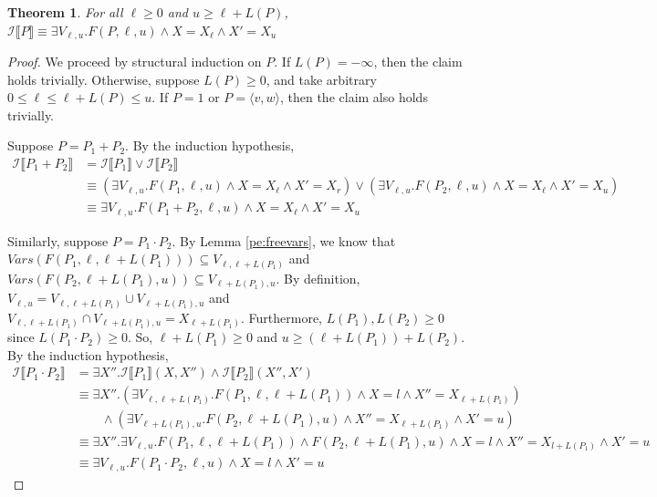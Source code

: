 \documentclass{article}
\newcommand{\tuple}[1]{\langle #1 \rangle}
\newcommand{\tf}[1]{\mathscr{I} \llbracket #1 \rrbracket}
\newcommand{\fv}[1]{\mathit{Vars}(#1)}
\newtheorem{theorem}{Theorem}
\theoremstyle{definition}
\begin{document}
\begin{theorem}
  For all $\ell \ge 0$ and $u \ge \ell + L(P)$,
  $\tf{P} \equiv \exists V_{\ell,u}. F(P, \ell, u) \land X =
  X_\ell \land X' = X_u$
\end{theorem}

\begin{proof}
  We proceed by structural induction on $P$. If $L(P) = -\infty$,
  then the claim holds trivially. Otherwise, suppose
  $L(P) \ge 0$, and take arbitrary
  $0 \le \ell \le \ell + L(P) \le u$. If $P = 1$ or
  $P = \tuple{v, w}$, then the claim also holds trivially.

  Suppose $P = P_1 + P_2$. By the induction hypothesis,
  \begin{align*}
    \tf{P_1 + P_2}
    &= \tf{P_1} \lor \tf{P_2} \\
    &\equiv
      (\exists V_{\ell,u}. F(P_1, \ell, u) \land X = X_\ell \land X' = X_r)
      \lor (\exists V_{\ell,u}. F(P_2, \ell, u) \land X = X_\ell \land X' =
      X_u) \\
    &\equiv
      \exists V_{\ell,u}. F(P_1+P_2,\ell,u) \land X = X_\ell \land X' = X_u
  \end{align*}

  Similarly, suppose $P = P_1 \cdot P_2$. By Lemma
  \ref{pe:freevars}, we know that
  $\fv{F(P_1, \ell, \ell + L(P_1))} \subseteq V_{\ell, \ell +
    L(P_1)}$ and
  $\fv{F(P_2, \ell + L(P_1), u)} \subseteq V_{\ell + L(P_1), u}$.
  By definition,
  $V_{\ell, u} = V_{\ell, \ell + L(P_1)} \cup V_{\ell + L(P_1),
    u}$ and
  $V_{\ell, \ell + L(P_1)} \cap V_{\ell + L(P_1), u} = X_{\ell +
    L(P_1)}$. Furthermore, $L(P_1), L(P_2) \ge 0$ since
  $L(P_1 \cdot P_2) \geq 0$. So, $\ell + L(P_1) \ge 0$ and
  $u \ge (\ell + L(P_1)) + L(P_2)$. By the induction hypothesis,
  \begin{align*}
    \tf{P_1 \cdot P_2}
    &= \exists X''.
      \tf{P_1}(X, X'') \land \tf{P_2}(X'', X') \\
    &\equiv \exists X''.
      (\exists V_{\ell, \ell + L(P_1)}. F(P_1, \ell, \ell + L(P_1)) \land
      X = l \land X'' = X_{\ell + L(P_1)}) \\
    & \qquad \land (\exists V_{\ell + L(P_1), u}.
      F(P_2, \ell + L(P_1), u) \land
      X'' = X_{\ell + L(P_1)} \land X' = u) \\
    &\equiv \exists X''.
      \exists V_{\ell, u}.
      F(P_1, \ell, \ell + L(P_1)) \land F(P_2, \ell + L(P_1), u) \land
      X = l \land X'' = X_{l + L(P_1)} \land X' = u \\
    &\equiv \exists V_{\ell, u}.
      F(P_1 \cdot P_2, \ell, u) \land X = l \land X' = u
  \end{align*}


\end{proof}
\end{document}
